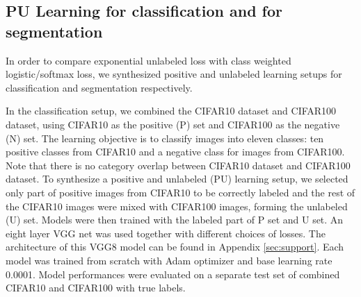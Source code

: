 
\subsection{PU Learning for classification and for segmentation}
\label{subsec:pulearning}

In order to compare exponential unlabeled loss with class weighted logistic/softmax loss, we synthesized positive and unlabeled learning setups for classification and segmentation respectively.

In the classification setup, we combined the CIFAR10 dataset and CIFAR100 dataset, using CIFAR10 as the positive (P) set and CIFAR100 as the negative (N) set.
The learning objective is to classify images into eleven classes: ten positive classes from CIFAR10 and a negative class for images from CIFAR100.
Note that there is no category overlap between CIFAR10 dataset and CIFAR100 dataset.
To synthesize a positive and unlabeled (PU) learning setup, we selected only part of positive images from CIFAR10 to be correctly labeled and the rest of the CIFAR10 images were mixed with CIFAR100 images, forming the unlabeled (U) set.
Models were then trained with the labeled part of P set and U set.
An eight layer VGG net was used together with different choices of losses.
The architecture of this VGG8 model can be found in Appendix \ref{sec:support}.
Each model was trained from scratch with Adam optimizer and base learning rate 0.0001.
Model performances were evaluated on a separate test set of combined CIFAR10 and CIFAR100 with true labels.

